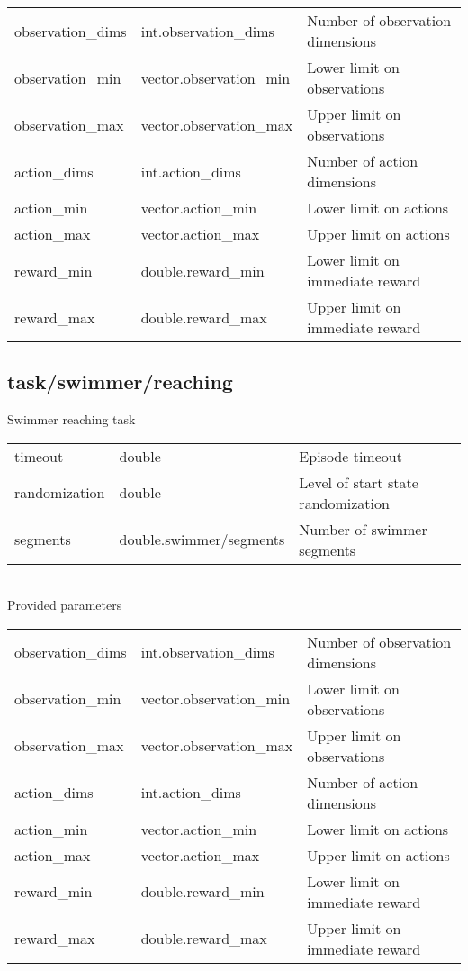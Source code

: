 \noindent\begin{tabular}{@{}lll@{}}
observation\_dims&int.observation\_dims&Number of observation dimensions\\
observation\_min&vector.observation\_min&Lower limit on observations\\
observation\_max&vector.observation\_max&Upper limit on observations\\
action\_dims&int.action\_dims&Number of action dimensions\\
action\_min&vector.action\_min&Lower limit on actions\\
action\_max&vector.action\_max&Upper limit on actions\\
reward\_min&double.reward\_min&Lower limit on immediate reward\\
reward\_max&double.reward\_max&Upper limit on immediate reward\\
\end{tabular}
\subsection{task/swimmer/reaching}
\noindent Swimmer reaching task\\

\noindent\begin{tabular}{@{}lll@{}}
timeout&double&Episode timeout\\
randomization&double&Level of start state randomization\\
segments&double.swimmer/segments&Number of swimmer segments\\
\end{tabular}
\\

\noindent Provided parameters\\

\noindent\begin{tabular}{@{}lll@{}}
observation\_dims&int.observation\_dims&Number of observation dimensions\\
observation\_min&vector.observation\_min&Lower limit on observations\\
observation\_max&vector.observation\_max&Upper limit on observations\\
action\_dims&int.action\_dims&Number of action dimensions\\
action\_min&vector.action\_min&Lower limit on actions\\
action\_max&vector.action\_max&Upper limit on actions\\
reward\_min&double.reward\_min&Lower limit on immediate reward\\
reward\_max&double.reward\_max&Upper limit on immediate reward\\
\end{tabular}
